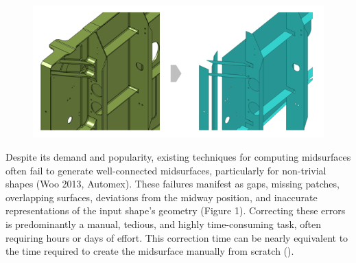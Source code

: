 \begin{figure}[h]
		\centering
		\includegraphics[width=0.9\linewidth]{images/MidsurfaceErrorsMscApex} %
		\label{fig:midsurfaceerrors}
\end{figure}


Despite its demand and popularity, existing techniques for computing midsurfaces often fail to generate well-connected midsurfaces, particularly for non-trivial shapes (Woo 2013, Automex). These failures manifest as gaps, missing patches, overlapping surfaces, deviations from the midway position, and inaccurate representations of the input shape's geometry (Figure 1). Correcting these errors is predominantly a manual, tedious, and highly time-consuming task, often requiring hours or days of effort. This correction time can be nearly equivalent to the time required to create the midsurface manually from scratch (\cite{Stolt2006}).


